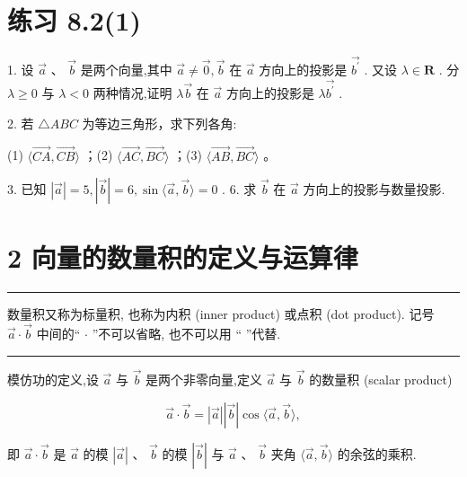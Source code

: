\documentclass[10pt]{article}
\newcommand{\HRule}{\begin{center}\rule{0.9\linewidth}{0.2mm}\end{center}}
\begin{document}
\section*{练习 8.2(1)}

1. 设 \(\overrightarrow{a}\text{ 、 }\overrightarrow{b}\) 是两个向量,其中 \(\overrightarrow{a} \neq  \overrightarrow{0},\overrightarrow{b}\) 在 \(\overrightarrow{a}\) 方向上的投影是 \(\overrightarrow{{b}^{\prime }}\) . 又设 \(\lambda  \in  \mathbf{R}\) . 分 \(\lambda  \geq  0\) 与 \(\lambda  < 0\) 两种情况,证明 \(\lambda \overrightarrow{b}\) 在 \(\overrightarrow{a}\) 方向上的投影是 \(\lambda \overrightarrow{{b}^{\prime }}\) .

2. 若 \(\bigtriangleup  {ABC}\) 为等边三角形，求下列各角:

(1) \(\langle \overrightarrow{CA},\overrightarrow{CB}\rangle\) ；(2) \(\langle \overrightarrow{AC},\overrightarrow{BC}\rangle\) ；(3) \(\langle \overrightarrow{AB},\overrightarrow{BC}\rangle\) 。

3. 已知 \(\left| \overrightarrow{a}\right|  = 5,\left| \overrightarrow{b}\right|  = 6,\sin \langle \overrightarrow{a},\overrightarrow{b}\rangle  = 0\) . 6. 求 \(\overrightarrow{b}\) 在 \(\overrightarrow{a}\) 方向上的投影与数量投影.

\section*{2 向量的数量积的定义与运算律}

\HRule

数量积又称为标量积, 也称为内积 (inner product) 或点积 (dot product). 记号 \(\overrightarrow{a} \cdot  \overrightarrow{b}\) 中间的“ \(\cdot\) ”不可以省略, 也不可以用 “  ”代替.

\HRule

模仿功的定义,设 \(\overrightarrow{a}\) 与 \(\overrightarrow{b}\) 是两个非零向量,定义 \(\overrightarrow{a}\) 与 \(\overrightarrow{b}\) 的数量积 (scalar product)

\[
\overrightarrow{a} \cdot  \overrightarrow{b} = \left| \overrightarrow{a}\right| \left| \overrightarrow{b}\right| \cos \langle \overrightarrow{a},\overrightarrow{b}\rangle ,
\]

即 \(\overrightarrow{a} \cdot  \overrightarrow{b}\) 是 \(\overrightarrow{a}\) 的模 \(\left| \overrightarrow{a}\right| \text{ 、 }\overrightarrow{b}\) 的模 \(\left| \overrightarrow{b}\right|\) 与 \(\overrightarrow{a}\text{ 、 }\overrightarrow{b}\) 夹角 \(\langle \overrightarrow{a},\overrightarrow{b}\rangle\) 的余弦的乘积.
\end{document}
